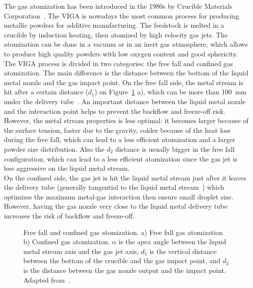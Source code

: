 \documentclass[../main]{subfiles}
\begin{document}
The gas atomization has been introduced in the 1980s by Crucible Materials Corporation~\cite{Jang2020PowderBased}. The VIGA is nowadays the most common process for producing metallic powders for additive manufacturing. The feedstock is melted in a crucible by induction heating, then atomized by high velocity gas jets. The atomization can be done in a vacuum or in an inert gas atmosphere, which allows to produce high quality powders with low oxygen content and good sphericity. The VIGA process is divided in two categories: the free fall and confined gas atomization. The main difference is the distance between the bottom of the liquid metal nozzle and the gas impact point. On the free fall side, the metal stream is hit after a certain distance ($d_{1}$) on Figure~\ref{free_fall_confined} a), which can be more than 100~mm under the delivery tube~\cite{Kassym2020AtomizationProcesses}. An important distance between the liquid metal nozzle and the interaction point helps to prevent the backflow and freeze-off risk. However, the metal stream properties is less optimal: it becomes larger because of the surface tension, faster due to the gravity, colder because of the heat loss during the free fall, which can lead to a less efficient atomization and a larger powder size distribution. Also the $d_{2}$ distance is usually bigger in the free fall configuration, which can lead to a less efficient atomization since the gas jet is less aggressive on the liquid metal stream.\\
On the confined side, the gas jet is hit the liquid metal stream just after it leaves the delivery tube (generally tangential to the liquid metal stream~\cite{Singh2001StudyFree}) which optimizes the maximum metal-gas interaction then ensure small droplet size. However, having the gas nozzle very close to the liquid metal delivery tube increases the risk of backflow and freeze-off.    

\vspace{0mm}
\begin{figure}[H]
    \centering
        
        \caption[Free fall and confined gas atomization]{Free fall and confined gas atomization. a) Free fall gas atomization b) Confined gas atomization. $\alpha$ is the apex angle between the liquid metal stream axis and the gas jet axis, $d_{1}$ is the vertical distance between the bottom of the crucible and the gas impact point, and $d_{2}$ is the distance between the gas nozzle output and the impact point. Adapted from~\cite{Goudar2017EffectAtomization}.}
        \label{free_fall_confined}
\end{figure}
\FloatBarrier
\vspace{0mm}
\end{document}
